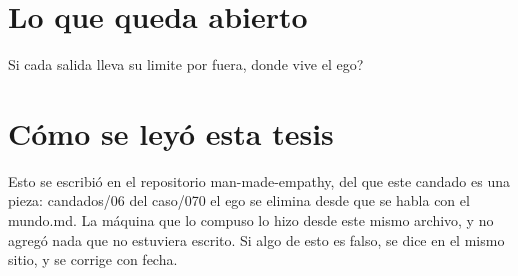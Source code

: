 \documentclass[11pt,a4paper]{article}
\begin{document}
\section{Lo que queda abierto}
\textquestiondown{}Si cada salida lleva su limite por fuera, donde vive el ego?

\section*{Cómo se leyó esta tesis}
Esto se escribió en el repositorio man-made-empathy, del que este candado es una pieza: candados/06 del caso/070 el ego se elimina desde que se habla con el mundo.md. La máquina que lo compuso lo hizo desde este mismo archivo, y no agregó nada que no estuviera escrito. Si algo de esto es falso, se dice en el mismo sitio, y se corrige con fecha.
\end{document}
